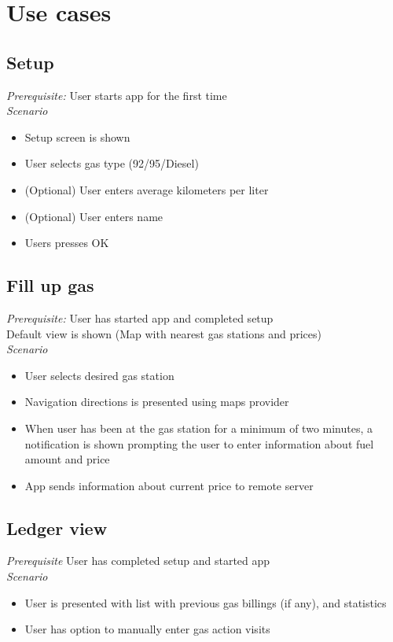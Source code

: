 
\chapter{Use cases}

\section{Setup}
\emph{Prerequisite:} User starts app for the first time\\

\emph{Scenario}
\begin{itemize}
\item Setup screen is shown
\item User selects gas type (92/95/Diesel)
\item (Optional) User enters average kilometers per liter
\item (Optional) User enters name
\item Users presses OK
\end{itemize}

\section{Fill up gas}
\emph{Prerequisite:} User has started app and completed setup\\
Default view is shown (Map with nearest gas stations and prices)\\

\emph{Scenario}
\begin{itemize}
	\item User selects desired gas station
\item Navigation  directions is presented using maps provider
\item When user has been at the gas station for a minimum of two minutes, a notification is shown prompting the user to enter information about fuel amount and price
\item App sends information about current price to remote server
\end{itemize}


\section{Ledger view}
\emph{Prerequisite} User has completed setup and started app\\

\emph{Scenario}
\begin{itemize}
	\item User is presented with list with previous gas billings (if any), and statistics
	\item User has option to manually enter gas action visits
\end{itemize}

